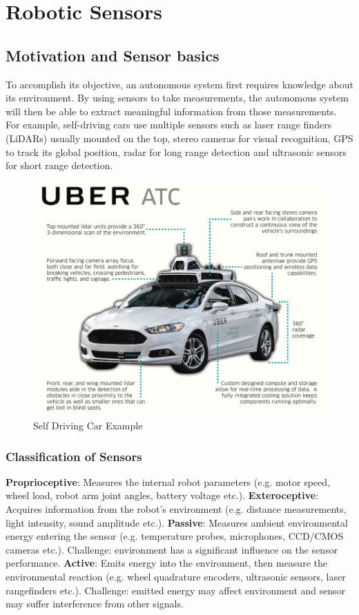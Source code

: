 \section{Robotic Sensors}

\subsection{Motivation and Sensor basics}
To accomplish its objective, an autonomous system first requires knowledge about its environment. By using sensors to take measurements, the autonomous system will then be able to extract meaningful information from those measurements. For example, self-driving cars use multiple sensors such as laser range finders (LiDARs) usually mounted on the top, stereo cameras for visual recognition, GPS to track its global position, radar for long range detection and ultrasonic sensors for short range detection.
\begin{figure}[H]
\centering
        \includegraphics[width =10 cm]{lecture_4/imgs/selfdrivingcar.png}
        \caption{Self Driving Car Example}
\end{figure}

\subsubsection{Classification of Sensors}

\textbf{Proprioceptive}: Measures the internal robot parameters (e.g. motor speed, wheel load, robot arm joint angles, battery voltage etc.). \newline \newline
\textbf{Exteroceptive}: Acquires information from the robot's environment (e.g. distance measurements, light intensity, sound amplitude etc.). \newline \newline
\textbf{Passive}: Measures ambient environmental energy entering the sensor (e.g. temperature probes, microphones, CCD/CMOS cameras etc.). Challenge: environment has a significant influence on the sensor performance.\newline \newline
\textbf{Active}: Emits energy into the environment, then measure the environmental reaction (e.g. wheel quadrature encoders, ultrasonic sensors, laser rangefinders etc.). Challenge: emitted energy may affect environment and sensor may suffer interference from other signals.


